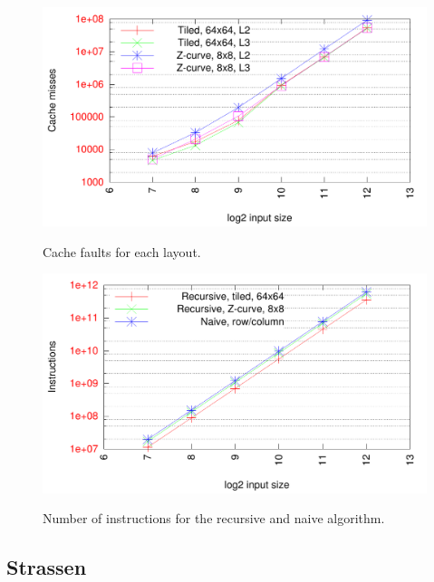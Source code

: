 \begin{figure}[h!]
  \centering
  \includegraphics[width=\textwidth]{"../project2/gnuplots/recursive_cache"}
  \label{fig:recursive_layout_cachefaults}
  \caption{Cache faults for each layout.}
\end{figure}

\begin{figure}[h!]
  \centering
  \includegraphics[width=\textwidth]{"../project2/gnuplots/recursive_instructions"}
  \label{fig:recursive_layout_instructions}
  \caption{Number of instructions for the recursive and naive algorithm.}
\end{figure}

\subsection{Strassen}


